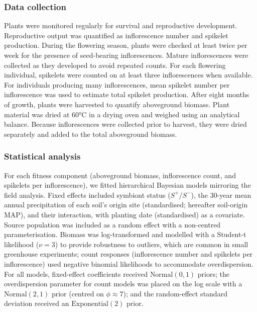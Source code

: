 \documentclass[12pt]{article}\usepackage[]{graphicx}\usepackage[dvipsnames]{xcolor}
\begin{document}
\subsubsection {Data collection}

Plants were monitored regularly for survival and reproductive development. 
Reproductive output was quantified as inflorescence number and spikelet production. 
During the flowering season, plants were checked at least twice per week for the presence of seed-bearing inflorescences. 
Mature inflorescences were collected as they developed to avoid repeated counts. 
For each flowering individual, spikelets were counted on at least three inflorescences when available.
For individuals producing many inflorescences, mean spikelet number per inflorescence was used to estimate total spikelet production.
After eight months of growth, plants were harvested to quantify aboveground biomass. 
Plant material was dried at 60°C in a drying oven and weighed using an analytical balance. 
Because inflorescences were collected prior to harvest, they were dried separately and added to the total aboveground biomass.

\subsubsection {Statistical analysis}
{}
\label{sec:greenhouse_models}
For each fitness component (aboveground biomass, inflorescence count, and spikelets per inflorescence), we fitted hierarchical Bayesian models mirroring the field analysis. Fixed effects included symbiont status 
($S^+$/$S^-$), the 30-year mean annual precipitation of each soil's origin site (standardised; hereafter soil-origin MAP), and their interaction, with planting date (standardised) as a covariate. 
Source population was included as a random effect with a non-centred parameterisation. 
Biomass was log-transformed and modelled with a Student-t likelihood ($\nu = 3$) to provide robustness to outliers, which are common in small greenhouse experiments; count responses (inflorescence number and spikelets 
per inflorescence) used negative binomial likelihoods to accommodate overdispersion. 
For all models, fixed-effect coefficients received $\text{Normal}(0, 1)$ priors; the overdispersion parameter for count models was placed on the log scale with a $\text{Normal}(2, 1)$ prior (centred on $\phi \approx 7$); and the random-effect standard deviation received an $\text{Exponential}(2)$ prior.
\end{document}
